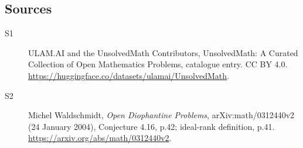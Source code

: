 \documentclass[11pt]{article}
\begin{document}
\subsection{Sources}
\begin{description}
\item[\hypertarget{source:statement:1}{S1}] ULAM.AI and the UnsolvedMath Contributors, UnsolvedMath: A Curated Collection of Open Mathematics Problems, catalogue entry. CC BY 4.0. \url{https://huggingface.co/datasets/ulamai/UnsolvedMath}.
\item[\hypertarget{source:statement:2}{S2}] Michel Waldschmidt, \emph{Open Diophantine Problems}, arXiv:math/0312440v2 (24 January 2004), Conjecture 4.16, p.42; ideal-rank definition, p.41. \url{https://arxiv.org/abs/math/0312440v2}.
\end{description}
\label{end:statement}
\end{document}
